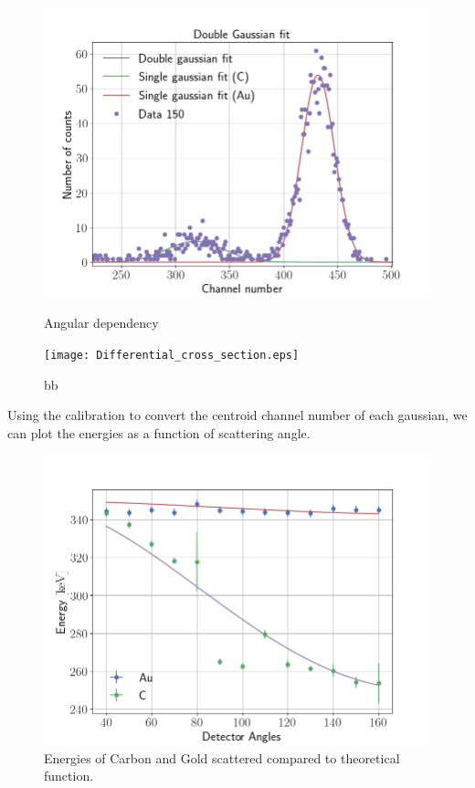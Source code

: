 \begin{figure}
\includegraphics[width=0.99\columnwidth]{Data_150}
\label{fig_angular_dependency2}
\caption{Angular dependency}
\end{figure}


\begin{figure}[h]
	\centering
		\texttt{[image: Differential\_cross\_section.eps]}
	\caption{bb}
	\label{fig:Differential_cross_section}
\end{figure}

Using the calibration to convert the centroid channel number of each gaussian,
we can plot the energies as a function of scattering angle.

\begin{figure}[h!]
\centering
\includegraphics[width=0.99\columnwidth]{fig_energy}
\caption{Energies of Carbon and Gold scattered compared to theoretical
function.}
\label{fig_energy}
\end{figure}




\newpage
